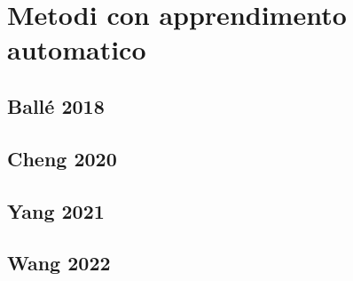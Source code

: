 \chapter{Metodi con apprendimento automatico}

\section{Ballé 2018}

\section{Cheng 2020}

\section{Yang 2021}

\section{Wang 2022}


